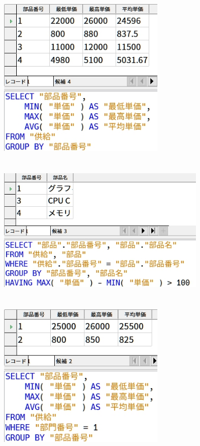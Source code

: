 \documentclass[a4paper,10pt]{jsarticle}
\begin{document}
\section{}
\begin{figure}[H]
  \centering
  \includegraphics[width=8cm]{./(7).png}
  \caption{}
  \label{}
\end{figure}

\section{}
\begin{figure}[H]
  \centering
  \includegraphics[width=10cm]{./(8).png}
  \caption{}
  \label{}
\end{figure}

\section{}
\begin{figure}[H]
  \centering
  \includegraphics[width=8cm]{./(9).png}
  \caption{}
  \label{}
\end{figure}
\end{document}
